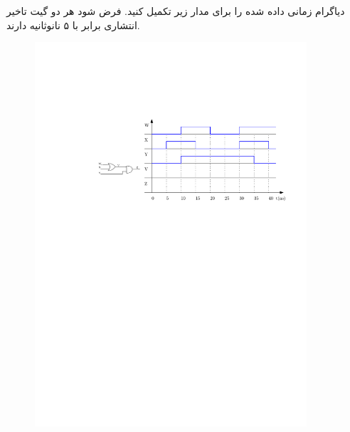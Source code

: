 
دیاگرام زمانی داده ‌شده را برای مدار زیر تکمیل کنید. فرض شود هر دو گیت تاخیر انتشاری برابر با ۵ نانوثانیه دارند.


\begin{figure}[h]
	\centering
	\includegraphics[width=0.9\textwidth]{fig/Q5.pdf}
	\label{fig:Q5}
\end{figure}